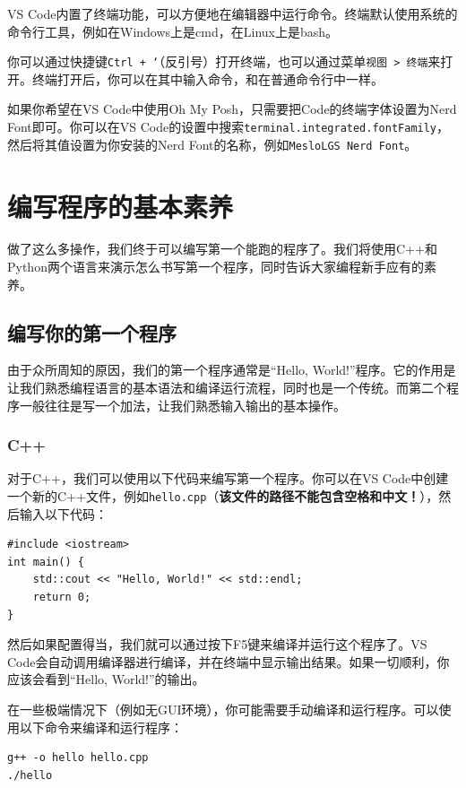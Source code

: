\documentclass[../main.tex]{subfiles}
\begin{document}
VS Code内置了终端功能，可以方便地在编辑器中运行命令。终端默认使用系统的命令行工具，例如在Windows上是cmd，在Linux上是bash。

你可以通过快捷键\texttt{Ctrl + `}（反引号）打开终端，也可以通过菜单\texttt{视图 > 终端}来打开。终端打开后，你可以在其中输入命令，和在普通命令行中一样。

如果你希望在VS Code中使用Oh My Posh，只需要把Code的终端字体设置为Nerd Font即可。你可以在VS Code的设置中搜索\texttt{terminal.integrated.fontFamily}，然后将其值设置为你安装的Nerd Font的名称，例如\texttt{MesloLGS Nerd Font}。

\section{编写程序的基本素养}

做了这么多操作，我们终于可以编写第一个能跑的程序了。我们将使用C++和Python两个语言来演示怎么书写第一个程序，同时告诉大家编程新手应有的素养。

\subsection{编写你的第一个程序}

由于众所周知的原因，我们的第一个程序通常是“Hello, World!”程序。它的作用是让我们熟悉编程语言的基本语法和编译运行流程，同时也是一个传统。而第二个程序一般往往是写一个加法，让我们熟悉输入输出的基本操作。

\subsubsection{C++}



对于C++，我们可以使用以下代码来编写第一个程序。你可以在VS Code中创建一个新的C++文件，例如\texttt{hello.cpp}（\textbf{该文件的路径不能包含空格和中文！}），然后输入以下代码：

\begin{verbatim}
#include <iostream>
int main() {
    std::cout << "Hello, World!" << std::endl;
    return 0;
}
\end{verbatim}

然后如果配置得当，我们就可以通过按下F5键来编译并运行这个程序了。VS Code会自动调用编译器进行编译，并在终端中显示输出结果。如果一切顺利，你应该会看到“Hello, World!”的输出。

在一些极端情况下（例如无GUI环境），你可能需要手动编译和运行程序。可以使用以下命令来编译和运行程序：

\begin{verbatim}
g++ -o hello hello.cpp
./hello
\end{verbatim}
\end{document}
